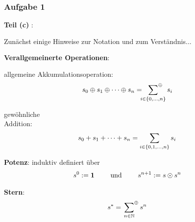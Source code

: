 \documentclass{beamer}
\begin{document}
\begin{frame}\frametitle{Aufgabe 1}
	\textbf{Teil (c)} :
	\small
	
	Zunächst einige Hinweise zur Notation und zum Verständnis...
	
	\pause
	
	\textbf{Verallgemeinerte Operationen}:
	
	\begin{minipage}[t]{\dimexpr0.5\linewidth-\fboxrule-\fboxsep}
		\centering
		allgemeine Akkumulationsoperation:
		\begin{equation*}
			s_0 \oplus s_1 \oplus \dots  \oplus s_n
			= \sideset{}{^\oplus}\sum_{i \in \left\{ 0, \dots, n \right\}} s_i
		\end{equation*}
	\end{minipage}
	\begin{minipage}[t]{\dimexpr0.5\linewidth-\fboxrule-\fboxsep}
		\centering \textcolor{cdgray!70}{%
		gewöhnliche \\
		Addition:
		\begin{equation*}
			s_0 + s_1 + \dots + s_n = \sum_{i \in \left\{ 0, 1, \dots, n \right\}} s_i
		\end{equation*}}
	\end{minipage}
	
	\pause
	
	\textbf{Potenz}: induktiv definiert über 
	\begin{equation*}
		s^0 \mathrel{:=} \mathbf{1} \qquad \text{ und } \qquad s^{n+1} \mathrel{:=} s \odot s^n
	\end{equation*}
	
	\pause
	
	\textbf{Stern}:
	\begin{equation*}
		s^\ast =  \sideset{}{^\oplus}\sum_{n \in \mathbb{N}} s^n
	\end{equation*}
\end{frame}
\end{document}
